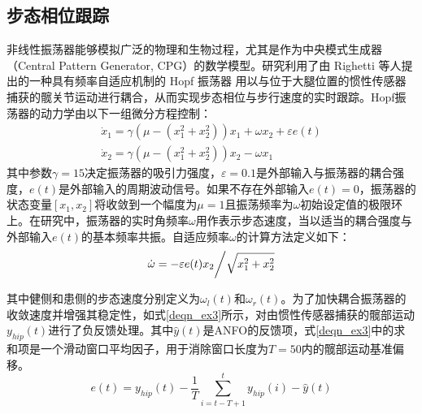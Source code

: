 \subsection{步态相位跟踪} 
非线性振荡器能够模拟广泛的物理和生物过程，尤其是作为中央模式生成器（Central Pattern Generator, CPG）的数学模型。研究利用了由 Righetti 等人提出的一种具有频率自适应机制的 Hopf 振荡器 \cite{righettiDynamicHebbianLearning2006}用以与位于大腿位置的惯性传感器捕获的髋关节运动进行耦合，从而实现步态相位与步行速度的实时跟踪。Hopf振荡器的动力学由以下一组微分方程控制：
\begin{equation}
\label{deqn_ex1}
\begin{array}{*{20}{l}}
{{{\dot x}_1} = \gamma \left( {\mu  - \left( {x_1^2 + x_2^2} \right)} \right){x_1} + \omega {x_2} + \varepsilon e(t)}  \\  
{{{\dot x}_2} = \gamma \left( {\mu  - \left( {x_1^2 + x_2^2} \right)} \right){x_2} - \omega {x_1}} 
\end{array}
\end{equation}   
其中参数$\gamma= 15$决定振荡器的吸引力强度，$\varepsilon  = 0.1$是外部输入与振荡器的耦合强度，$e(t)$是外部输入的周期波动信号。如果不存在外部输入$e(t)=0$，振荡器的状态变量$[{x_1},{x_2}]$将收敛到一个幅度为$\mu=1$且振荡频率为$\omega$初始设定值的极限环上。在研究中，振荡器的实时角频率$\omega$用作表示步态速度，当以适当的耦合强度与外部输入$e(t)$的基本频率共振。自适应频率$\omega$的计算方法定义如下：
\begin{equation}
\label{deqn_ex2}
\dot \omega  = {{ - \varepsilon e(t){x_2}} \mathord{\left/
{\vphantom {{ - \varepsilon e(t){x_2}} {\sqrt {x_1^2 + x_2^2} }}} \right.
\kern-\nulldelimiterspace} {\sqrt {x_1^2 + x_2^2} }}
\end{equation}    

其中健侧和患侧的步态速度分别定义为${\omega _l}(t)$和${\omega _r}(t)$。为了加快耦合振荡器的收敛速度并增强其稳定性，如式\ref{deqn_ex3}所示，对由惯性传感器捕获的髋部运动${y_{hip}}(t)$进行了负反馈处理。其中$\hat y(t)$是ANFO的反馈项，式\ref{deqn_ex3}中的求和项是一个滑动窗口平均因子，用于消除窗口长度为$T = 50$内的髋部运动基准偏移。
\begin{equation}
\label{deqn_ex3}
e(t) = {y_{hip}}(t) - \frac{1}{T}\sum\limits_{i = t - T + 1}^t {{y_{hip}}(i)}  - \hat y(t)
\end{equation}   

